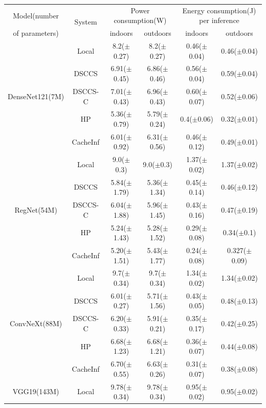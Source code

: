 \begin{table}[htb]

\centering
\begin{tabular}{cc|c|c|c|c}
\toprule
Model(number & \multirow[c]{2}{*}{System} & \multicolumn{2}{|c|}{Power consumption(W)} & \multicolumn{2}{|c}{Energy consumption(J) per inference} \\
of parameters)&  & indoors & outdoors & indoors & outdoors \\
\midrule
\multirow[c]{5}{*}{DenseNet121(7M)} & Local & 8.2($\pm$0.27) & 8.2($\pm$0.27) & 0.46($\pm$0.04) & 0.46($\pm$0.04) \\
 & DSCCS & 6.91($\pm$0.45) & 6.86($\pm$0.46) & 0.56($\pm$0.04) & 0.59($\pm$0.04) \\
 & DSCCS-C & 7.01($\pm$0.43) & 6.96($\pm$0.43) & 0.60($\pm$0.07) & 0.52($\pm$0.06) \\
 & HP & 5.36($\pm$0.79) & 5.79($\pm$0.24) & 0.4($\pm$0.06) & 0.32($\pm$0.01) \\
 & CacheInf & 6.01($\pm$0.92) & 6.31($\pm$0.56) & 0.46($\pm$0.12) & 0.49($\pm$0.01) \\
\cline{1-6}
\multirow[c]{5}{*}{RegNet(54M)} & Local & 9.0($\pm$0.3) & 9.0($\pm$0.3) & 1.37($\pm$0.02) & 1.37($\pm$0.02) \\
& DSCCS & 5.84($\pm$1.79) & 5.36($\pm$1.34) & 0.45($\pm$0.14) & 0.46($\pm$0.12) \\
 & DSCCS-C & 6.04($\pm$1.88) & 5.96($\pm$1.45) & 0.43($\pm$0.16) & 0.47($\pm$0.19) \\
 & HP & 5.24($\pm$1.43) & 5.28($\pm$1.52) & 0.29($\pm$0.08) & 0.34($\pm$0.1) \\
 & CacheInf & 5.20($\pm$1.51) & 5.43($\pm$1.77) & 0.24($\pm$0.08) & 0.327($\pm$0.09) \\
\cline{1-6}
\multirow[c]{5}{*}{ConvNeXt(88M)} & Local & 9.7($\pm$0.34) & 9.7($\pm$0.34) & 1.34($\pm$0.02) & 1.34($\pm$0.02) \\
& DSCCS & 6.01($\pm$0.27) & 5.71($\pm$1.56) & 0.43($\pm$0.05) & 0.48($\pm$0.13) \\
& DSCCS-C & 6.20($\pm$0.33) & 5.91($\pm$0.21) & 0.35($\pm$0.17) & 0.42($\pm$0.25) \\
 & HP & 6.68($\pm$1.23) & 6.68($\pm$1.21) & 0.36($\pm$0.07) & 0.44($\pm$0.08) \\
 & CacheInf & 6.70($\pm$0.55) & 6.63($\pm$0.26) & 0.31($\pm$0.07) & 0.38($\pm$0.08) \\
\cline{1-6}
\multirow[c]{5}{*}{VGG19(143M)} & Local & 9.78($\pm$0.34) & 9.78($\pm$0.34) & 0.95($\pm$0.02) & 0.95($\pm$0.02) \\

\end{tabular}
\end{table}
